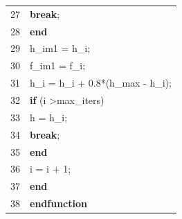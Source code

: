 \documentclass[bosnian,12pt,a4paper]{report}
\begin{document}
\begin{tabular}{ll}
27 & \hspace*{3cm}\textbf{break};                                                                                              \\
28 & \hspace*{2cm}\textbf{end}
\\
29 & \hspace*{2cm}h\_im1 = h\_i;                                                                                      \\
30 & \hspace*{2cm}f\_im1 = f\_i;                                                                                      \\
31 & \hspace*{2cm}h\_i = h\_i + 0.8*(h\_max - h\_i);                                                                  \\
32 & \hspace*{2cm}\textbf{if} (i \textgreater max\_iters)                                                                      \\
33 & \hspace*{3cm}h = h\_i;                                                                                           \\
34 & \hspace*{3cm}\textbf{break};                                                                                              \\
35 & \hspace*{2cm}\textbf{end}                                                                                                 \\
36 & \hspace*{2cm}i = i + 1;                                                                                          \\
37 & \hspace*{1cm}\textbf{end                                                                                                } \\
38 & \textbf{endfunction}                                                                                       \\ \hline
\end{tabular}


\vspace*{0.5cm}
\end{document}
